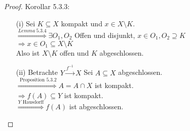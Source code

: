 \begin{proof}{Korollar 5.3.3:}\\
    \begin{itemize}
        \item[(i)] Sei $K \subseteq X$ kompakt und $x \in X \setminus K$.\\
        $\overset{Lemma \ 5.3.4}{\Rightarrow} 
        \exists O_1, O_2 $ Offen und disjunkt, $x \in O_1, O_2 \supseteq K$\\

        $\Rightarrow x \in O_1 \subseteq X \setminus K$\\ 
        Also ist $X \setminus K$ offen und $K$ abgeschlossen.
        \item[(ii)] Betrachte $Y \overset{f^{-1}}{\longrightarrow}X$
        Sei $A \subseteq X$ abgeschlossen.\\
        $\overset{\text{ Proposition \ 5.3.2}}{\Rightarrow} A = A \cap X$ ist kompakt.\\
        $\Rightarrow f(A) \subseteq Y $ ist kompakt.\\
        $\overset{Y \text{ Hausdorff}}{\Rightarrow} f(A)$ ist abgeschlossen.\\
    \end{itemize}

\end{proof}